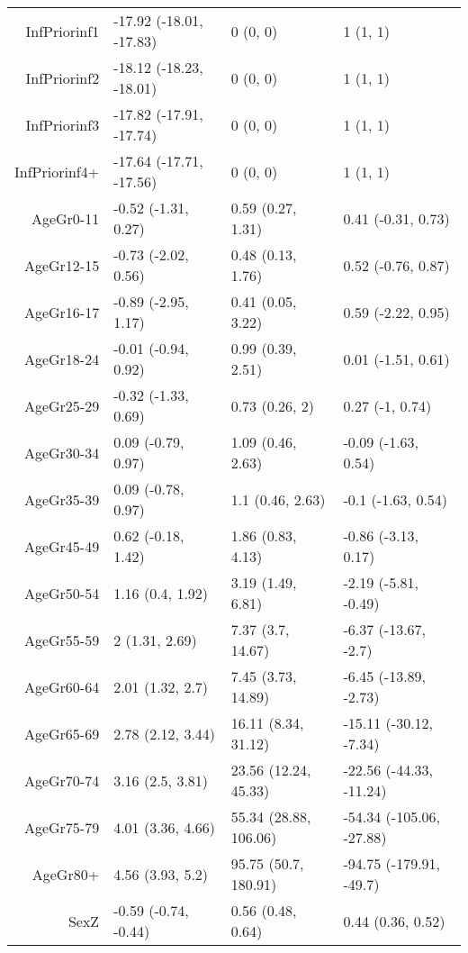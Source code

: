 \begin{table}[ht]
\begin{tabular}{rlll}
  InfPriorinf1 & -17.92 (-18.01, -17.83) & 0 (0, 0) & 1 (1, 1) \\ 
  InfPriorinf2 & -18.12 (-18.23, -18.01) & 0 (0, 0) & 1 (1, 1) \\ 
  InfPriorinf3 & -17.82 (-17.91, -17.74) & 0 (0, 0) & 1 (1, 1) \\ 
  InfPriorinf4+ & -17.64 (-17.71, -17.56) & 0 (0, 0) & 1 (1, 1) \\ 
  AgeGr0-11 & -0.52 (-1.31, 0.27) & 0.59 (0.27, 1.31) & 0.41 (-0.31, 0.73) \\ 
  AgeGr12-15 & -0.73 (-2.02, 0.56) & 0.48 (0.13, 1.76) & 0.52 (-0.76, 0.87) \\ 
  AgeGr16-17 & -0.89 (-2.95, 1.17) & 0.41 (0.05, 3.22) & 0.59 (-2.22, 0.95) \\ 
  AgeGr18-24 & -0.01 (-0.94, 0.92) & 0.99 (0.39, 2.51) & 0.01 (-1.51, 0.61) \\ 
  AgeGr25-29 & -0.32 (-1.33, 0.69) & 0.73 (0.26, 2) & 0.27 (-1, 0.74) \\ 
  AgeGr30-34 & 0.09 (-0.79, 0.97) & 1.09 (0.46, 2.63) & -0.09 (-1.63, 0.54) \\ 
  AgeGr35-39 & 0.09 (-0.78, 0.97) & 1.1 (0.46, 2.63) & -0.1 (-1.63, 0.54) \\ 
  AgeGr45-49 & 0.62 (-0.18, 1.42) & 1.86 (0.83, 4.13) & -0.86 (-3.13, 0.17) \\ 
  AgeGr50-54 & 1.16 (0.4, 1.92) & 3.19 (1.49, 6.81) & -2.19 (-5.81, -0.49) \\ 
  AgeGr55-59 & 2 (1.31, 2.69) & 7.37 (3.7, 14.67) & -6.37 (-13.67, -2.7) \\ 
  AgeGr60-64 & 2.01 (1.32, 2.7) & 7.45 (3.73, 14.89) & -6.45 (-13.89, -2.73) \\ 
  AgeGr65-69 & 2.78 (2.12, 3.44) & 16.11 (8.34, 31.12) & -15.11 (-30.12, -7.34) \\ 
  AgeGr70-74 & 3.16 (2.5, 3.81) & 23.56 (12.24, 45.33) & -22.56 (-44.33, -11.24) \\ 
  AgeGr75-79 & 4.01 (3.36, 4.66) & 55.34 (28.88, 106.06) & -54.34 (-105.06, -27.88) \\ 
  AgeGr80+ & 4.56 (3.93, 5.2) & 95.75 (50.7, 180.91) & -94.75 (-179.91, -49.7) \\ 
  SexZ & -0.59 (-0.74, -0.44) & 0.56 (0.48, 0.64) & 0.44 (0.36, 0.52) \\ 
   \hline
\end{tabular}
\end{table}
